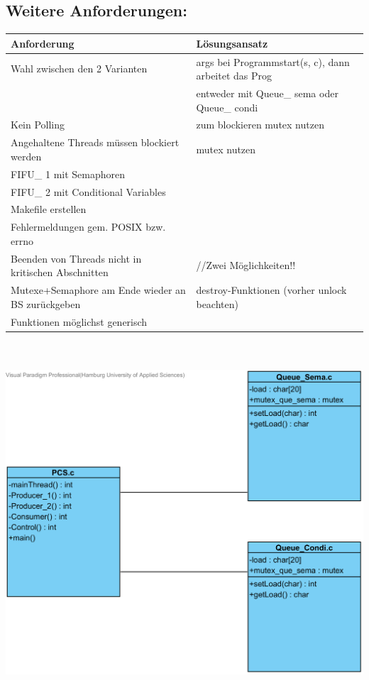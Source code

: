 \documentclass[paper=a4, fontsize=12pt]{article}
\begin{document}
\subsection{Weitere Anforderungen:}
\begin{tabular}{l|l}
Anforderung & Lösungsansatz \\
\hline
Wahl zwischen den 2 Varianten &  args bei Programmstart(s, c), dann arbeitet das Prog \\
  & entweder mit Queue\_ sema oder Queue\_ condi\\
\hline
Kein Polling & zum blockieren mutex nutzen \\ 
\hline
Angehaltene Threads müssen blockiert werden & mutex nutzen \\ 
\hline
FIFU\_ 1 mit Semaphoren &  \\ 
\hline
FIFU\_ 2 mit Conditional Variables & \\
\hline
Makefile erstellen &  \\
\hline
Fehlermeldungen gem. POSIX bzw. errno &  \\
\hline
Beenden von Threads nicht in kritischen Abschnitten & //Zwei Möglichkeiten!! \\
\hline
Mutexe+Semaphore am Ende wieder an BS zurückgeben & destroy-Funktionen (vorher unlock beachten) \\
\hline
Funktionen möglichst generisch &  \\
\end{tabular}
\\
\\
\includegraphics[scale=1]{Entwurf v1-0.png}
\end{document}
